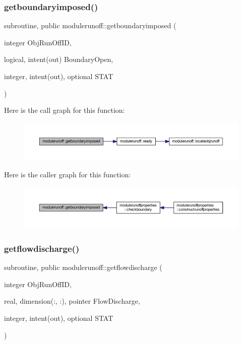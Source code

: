 \subsubsection{\texorpdfstring{getboundaryimposed()}{getboundaryimposed()}}
{\footnotesize\ttfamily subroutine, public modulerunoff\+::getboundaryimposed (\begin{DoxyParamCaption}\item[{integer}]{Obj\+Run\+Off\+ID,  }\item[{logical, intent(out)}]{Boundary\+Open,  }\item[{integer, intent(out), optional}]{S\+T\+AT }\end{DoxyParamCaption})}

Here is the call graph for this function\+:
\nopagebreak
\begin{figure}[H]
\begin{center}
\leavevmode
\includegraphics[width=350pt]{namespacemodulerunoff_a721381be9f2b0f07b9349c1a1df63001_cgraph}
\end{center}
\end{figure}
Here is the caller graph for this function\+:
\nopagebreak
\begin{figure}[H]
\begin{center}
\leavevmode
\includegraphics[width=350pt]{namespacemodulerunoff_a721381be9f2b0f07b9349c1a1df63001_icgraph}
\end{center}
\end{figure}
\mbox{\label{namespacemodulerunoff_a35dbdf0f3737830c01b78496fc043851}} 
\subsubsection{\texorpdfstring{getflowdischarge()}{getflowdischarge()}}
{\footnotesize\ttfamily subroutine, public modulerunoff\+::getflowdischarge (\begin{DoxyParamCaption}\item[{integer}]{Obj\+Run\+Off\+ID,  }\item[{real, dimension(\+:, \+:), pointer}]{Flow\+Discharge,  }\item[{integer, intent(out), optional}]{S\+T\+AT }\end{DoxyParamCaption})}

